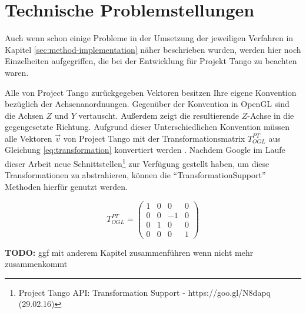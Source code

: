 \section{Technische Problemstellungen}

Auch wenn schon einige Probleme in der Umsetzung der jeweiligen Verfahren in Kapitel \ref{sec:method-implementation} näher beschrieben wurden, werden hier noch Einzelheiten aufgegriffen, die bei der Entwicklung für Projekt Tango zu beachten waren. 

Alle von Project Tango zurückgegeben Vektoren besitzen Ihre eigene Konvention bezüglich der Achsenanordnungen. Gegenüber der Konvention in OpenGL sind die Achsen \(Z\) und \(Y\) vertauscht. Außerdem zeigt die resultierende \(Z\)-Achse in die gegengesetzte Richtung. Aufgrund dieser Unterschiedlichen Konvention müssen alle Vektoren \(\vec{v}\) von Project Tango mit der Transformationsmatrix \(T_{OGL}^{PT}\) aus Gleichung \ref{eq:transformation} konvertiert werden \citep{Proje15:online}. Nachdem Google im Laufe dieser Arbeit neue Schnittstellen\footnote{Project Tango API: Transformation Support - https://goo.gl/N8dapq (29.02.16)} zur Verfügung gestellt haben, um diese Transformationen zu abstrahieren, können die \enquote{TransformationSupport} Methoden hierfür genutzt werden.

\begin{equation} \label{eq:transformation}
T_{OGL}^{PT} =\left( \begin{matrix} 1&0&0&0\\0&0&-1&0\\0&1&0&0\\0&0&0&1 \end{matrix} \right)
\end{equation}

\textbf{TODO:} ggf mit anderem Kapitel zusammenführen wenn nicht mehr zusammenkommt